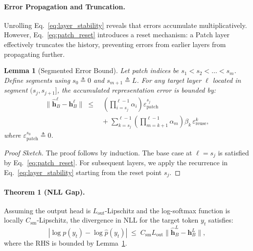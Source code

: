 \documentclass{article}
\theoremstyle{plain}
\newtheorem{lemma}[theorem]{Lemma}
\theoremstyle{definition}
\theoremstyle{remark}
\begin{document}
\paragraph{Error Propagation and Truncation.}
Unrolling Eq.~\eqref{eq:layer_stability} reveals that errors accumulate multiplicatively.
However, Eq.~\eqref{eq:patch_reset} introduces a reset mechanism: a Patch layer effectively truncates the history, preventing errors from earlier layers from propagating further.

\begin{lemma}[Segmented Error Bound]
\label{lem:segmented_error}
Let patch indices be $s_1 < s_2 < \dots < s_m$. Define segments using $s_0 \triangleq 0$ and $s_{m+1} \triangleq L$.
For any target layer $\ell$ located in segment $(s_j, s_{j+1}]$, the accumulated representation error is bounded by:
\begin{equation}
\label{eq:segmented_bound}
\begin{aligned}
\lVert \hat{\mathbf{h}}_B^\ell - \mathbf{h}_B^\ell \rVert
\;\le\;&
\left(\prod_{i=s_j}^{\ell-1} \alpha_i\right) \varepsilon_{\mathrm{patch}}^{s_j} \\
&+\; \sum_{k=s_j}^{\ell-1} \left(\prod_{m=k+1}^{\ell-1} \alpha_m\right) \beta_k \, \varepsilon_{\mathrm{reuse}}^k,
\end{aligned}
\end{equation}
where $\varepsilon_{\mathrm{patch}}^{s_0} \triangleq 0$.
\end{lemma}

\begin{proof}[Proof Sketch]
\renewcommand{\qedsymbol}{}
The proof follows by induction. The base case at $\ell=s_j$ is satisfied by Eq.~\eqref{eq:patch_reset}. For subsequent layers, we apply the recurrence in Eq.~\eqref{eq:layer_stability} starting from the reset point $s_j$.
\end{proof}

\paragraph{Theorem 1 (NLL Gap).}
Assuming the output head is $L_{\mathrm{out}}$-Lipschitz and the log-softmax function is locally $C_{\mathrm{sm}}$-Lipschitz, the divergence in NLL for the target token $y_t$ satisfies:
\begin{equation}
\label{eq:nll_gap}
\left| \log p(y_t) - \log \hat{p}(y_t) \right|
\;\le\;
C_{\mathrm{sm}} L_{\mathrm{out}} \lVert \hat{\mathbf{h}}_B^L - \mathbf{h}_B^L \rVert,
\end{equation}
where the RHS is bounded by Lemma~\ref{lem:segmented_error}.
\end{document}

